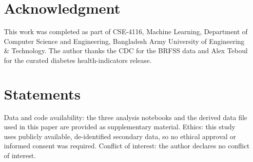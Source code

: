 \documentclass[conference]{IEEEtran}
\begin{document}
\section*{Acknowledgment}

This work was completed as part of CSE-4116, Machine Learning, Department of Computer Science and Engineering, Bangladesh Army University of Engineering \& Technology. The author thanks the CDC for the BRFSS data and Alex Teboul for the curated diabetes health-indicators release.

\section*{Statements}

Data and code availability: the three analysis notebooks and the derived data file used in this paper are provided as supplementary material. Ethics: this study uses publicly available, de-identified secondary data, so no ethical approval or informed consent was required. Conflict of interest: the author declares no conflict of interest.
\end{document}
